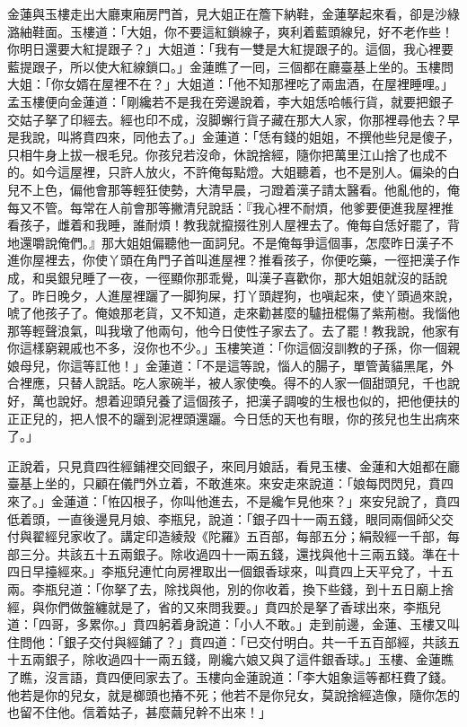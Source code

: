 金蓮與玉樓走出大廳東廂房門首，見大姐正在簷下納鞋，金蓮拏起來看，卻是沙綠潞紬鞋面。玉樓道：「大姐，你不要這紅鎖線子，爽利着藍頭線兒，好不老作些！你明日還要大紅提跟子？」大姐道：「我有一雙是大紅提跟子的。這個，我心裡要藍提跟子，所以使大紅線鎖口。」金蓮瞧了一囘，三個都在廳臺基上坐的。玉樓問大姐：「你女婿在屋裡不在？」大姐道：「他不知那裡吃了兩盅酒，在屋裡睡哩。」孟玉樓便向金蓮道：「剛纔若不是我在旁邊說着，李大姐恁哈帳行貨，就要把銀子交姑子拏了印經去。經也印不成，沒脚蠏行貨子藏在那大人家，你那裡尋他去？早是我說，叫將賁四來，同他去了。」金蓮道：「恁有錢的姐姐，不撰他些兒是傻子，只相牛身上拔一根毛兒。你孩兒若沒命，休說捨經，隨你把萬里江山捨了也成不的。如今這屋裡，只許人放火，不許俺每點燈。大姐聽着，也不是別人。偏染的白兒不上色，偏他會那等輕狂使勢，大清早晨，刁蹬着漢子請太醫看。他亂他的，俺每又不管。每常在人前會那等撇清兒說話：『我心裡不耐煩，他爹要便進我屋裡推看孩子，雌着和我睡，誰耐煩！教我就攛掇徃別人屋裡去了。俺每自恁好罷了，{}{}背地還嚼說俺們。』那大姐姐偏聽他一面詞兒。不是俺每爭這個事，怎麼昨日漢子不進你屋裡去，你使丫頭在角門子首叫進屋裡？推看孩子，你便吃藥，一徑把漢子作成，和吳銀兒睡了一夜，{}一徑顯你那乖覺，叫漢子喜歡你，那大姐姐就沒的話說了。昨日晚夕，人進屋裡躧了一脚狗屎，打丫頭趕狗，也嗔起來，使丫頭過來說，唬了他孩子了。俺娘那老貨，又不知道，走來勸甚麼的驢扭棍傷了紫荊樹。我惱他那等輕聲浪氣，叫我墩了他兩句，他今日使性子家去了。去了罷！教我說，他家有你這樣窮親戚也不多，沒你也不少。」玉樓笑道：「你這個沒訓教的子孫，你一個親娘母兒，你這等訌他！」金蓮道：「不是這等說，惱人的腸子，單管黃貓黑尾，外合裡應，只替人說話。吃人家碗半，被人家使喚。得不的人家一個甜頭兒，千也說好，萬也說好。想着迎頭兒養了這個孩子，把漢子調唆的生根也似的，把他便扶的正正兒的，把人恨不的躧到泥裡頭還躧。今日恁的天也有眼，你的孩兒也生出病來了。」

正說着，只見賁四徃經鋪裡交囘銀子，來囘月娘話，看見玉樓、金蓮和大姐都在廳臺基上坐的，只顧在儀門外立着，不敢進來。來安走來說道：「娘每閃閃兒，賁四來了。」金蓮道：「恠囚根子，你叫他進去，不是纔乍見他來？」來安兒說了，賁四低着頭，一直後邊見月娘、李瓶兒，說道：「銀子四十一兩五錢，眼同兩個師父交付與翟經兒家收了。講定印造綾殼《陀羅》五百部，每部五分；絹殼經一千部，每部三分。共該五十五兩銀子。除收過四十一兩五錢，還找與他十三兩五錢。準在十四日早擡經來。」李瓶兒連忙向房裡取出一個銀香球來，叫賁四上天平兌了，十五兩。李瓶兒道：「你拏了去，除找與他，別的你收着，換下些錢，到十五日廟上捨經，與你們做盤纏就是了，省的又來問我要。」賁四於是拏了香球出來，李瓶兒道：「四哥，多累你。」賁四躬着身說道：「小人不敢。」走到前邊，金蓮、玉樓又叫住問他：「銀子交付與經鋪了？」賁四道：「已交付明白。共一千五百部經，共該五十五兩銀子，除收過四十一兩五錢，剛纔六娘又與了這件銀香球。」玉樓、金蓮瞧了瞧，沒言語，賁四便囘家去了。玉樓向金蓮說道：「李大姐象這等都枉費了錢。他若是你的兒女，就是榔頭也摏不死；他若不是你兒女，莫說捨經造像，隨你怎的也留不住他。信着姑子，甚麼繭兒幹不出來！」

